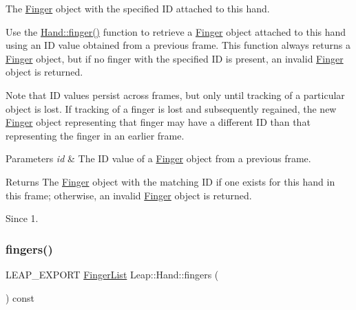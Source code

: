 The \hyperlink{class_leap_1_1_finger}{Finger} object with the specified ID attached to this hand.

Use the \hyperlink{class_leap_1_1_hand_afe7cf68c3375a2e45f90d80698313ccb}{Hand\+::finger()} function to retrieve a \hyperlink{class_leap_1_1_finger}{Finger} object attached to this hand using an ID value obtained from a previous frame. This function always returns a \hyperlink{class_leap_1_1_finger}{Finger} object, but if no finger with the specified ID is present, an invalid \hyperlink{class_leap_1_1_finger}{Finger} object is returned.


\begin{DoxyCodeInclude}
\end{DoxyCodeInclude}


Note that ID values persist across frames, but only until tracking of a particular object is lost. If tracking of a finger is lost and subsequently regained, the new \hyperlink{class_leap_1_1_finger}{Finger} object representing that finger may have a different ID than that representing the finger in an earlier frame.


\begin{DoxyParams}{Parameters}
{\em id} & The ID value of a \hyperlink{class_leap_1_1_finger}{Finger} object from a previous frame. \\
\hline
\end{DoxyParams}
\begin{DoxyReturn}{Returns}
The \hyperlink{class_leap_1_1_finger}{Finger} object with the matching ID if one exists for this hand in this frame; otherwise, an invalid \hyperlink{class_leap_1_1_finger}{Finger} object is returned. 
\end{DoxyReturn}
\begin{DoxySince}{Since}
1. 
\end{DoxySince}
\mbox{\label{class_leap_1_1_hand_a48bed0aebb87180056eab2bbfbc1e5fe}} 
\subsubsection{\texorpdfstring{fingers()}{fingers()}}
{\footnotesize\ttfamily L\+E\+A\+P\+\_\+\+E\+X\+P\+O\+RT \hyperlink{class_leap_1_1_finger_list}{Finger\+List} Leap\+::\+Hand\+::fingers (\begin{DoxyParamCaption}{ }\end{DoxyParamCaption}) const}

